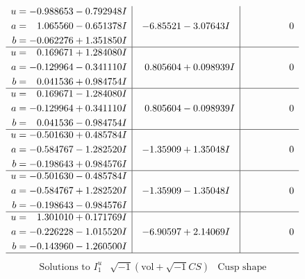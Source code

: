 \documentclass[1p]{elsarticle_modified}
\theoremstyle{definition}
\newcommand{\I}{\sqrt{-1}}
\begin{document}
$$\begin{array}{c|c|c}
\begin{aligned}
u &= -0.988653 - 0.792948 I \\
a &= \phantom{-}1.065560 - 0.651378 I \\
b &= -0.062276 + 1.351850 I\end{aligned}
 & -6.85521 - 3.07643 I & \phantom{-0.000000 } 0 \\ \hline\begin{aligned}
u &= \phantom{-}0.169671 + 1.284080 I \\
a &= -0.129964 - 0.341110 I \\
b &= \phantom{-}0.041536 + 0.984754 I\end{aligned}
 & \phantom{-}0.805604 + 0.098939 I & \phantom{-0.000000 } 0 \\ \hline\begin{aligned}
u &= \phantom{-}0.169671 - 1.284080 I \\
a &= -0.129964 + 0.341110 I \\
b &= \phantom{-}0.041536 - 0.984754 I\end{aligned}
 & \phantom{-}0.805604 - 0.098939 I & \phantom{-0.000000 } 0 \\ \hline\begin{aligned}
u &= -0.501630 + 0.485784 I \\
a &= -0.584767 - 1.282520 I \\
b &= -0.198643 + 0.984576 I\end{aligned}
 & -1.35909 + 1.35048 I & \phantom{-0.000000 } 0 \\ \hline\begin{aligned}
u &= -0.501630 - 0.485784 I \\
a &= -0.584767 + 1.282520 I \\
b &= -0.198643 - 0.984576 I\end{aligned}
 & -1.35909 - 1.35048 I & \phantom{-0.000000 } 0 \\ \hline\begin{aligned}
u &= \phantom{-}1.301010 + 0.171769 I \\
a &= -0.226228 - 1.015520 I \\
b &= -0.143960 - 1.260500 I\end{aligned}
 & -6.90597 + 2.14069 I & \phantom{-0.000000 } 0\\
 \hline 
 \end{array}$$\newpage$$\begin{array}{c|c|c}  
\text{Solutions to }I^u_{1}& \I (\text{vol} + \sqrt{-1}CS) & \text{Cusp shape}\\
 \hline 
\begin{aligned}

\end{aligned}
\end{array}$$
\end{document}
